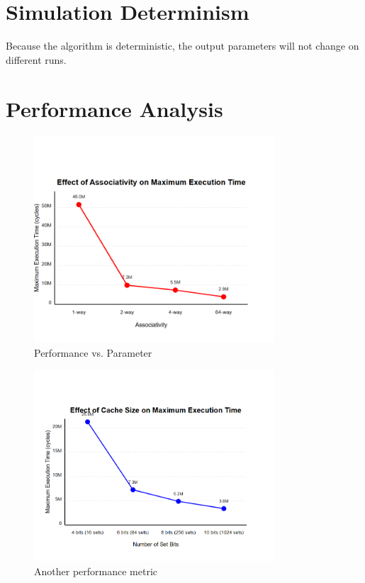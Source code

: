 \documentclass[12pt,a4paper]{article}
\begin{document}
\section{Simulation Determinism}

Because the algorithm is deterministic, the output parameters will not change on different runs.

\section{Performance Analysis}

\begin{figure}[H]
    \centering
    \includegraphics[width=0.8\textwidth]{image1_s3.png}
    \caption{Performance vs. Parameter}
    \label{fig:performance}
\end{figure}

\begin{figure}[H]
    \centering
    \includegraphics[width=0.8\textwidth]{image2_s3.png}
    \caption{Another performance metric}
    \label{fig:performance2}
\end{figure}
\end{document}
